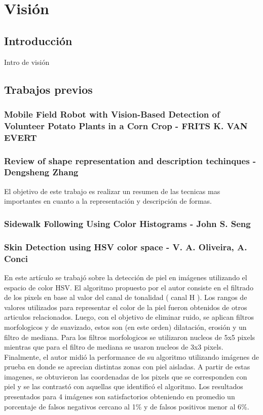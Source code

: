\section{Visi\'on}

\subsection{Introducci\'on}
Intro de visi\'on

\subsection{Trabajos previos}
	\subsubsection{Mobile Field Robot with Vision-Based Detection of Volunteer Potato Plants in a Corn Crop - FRITS K. VAN EVERT}
	\cite{potato}
	\subsubsection{Review of shape representation and description techinques - Dengsheng Zhang}
El objetivo de este trabajo es realizar un resumen de las tecnicas mas importantes en cuanto a la representación y descripción de formas.
	\subsubsection{Sidewalk Following Using Color Histograms - John S. Seng}
	\subsubsection{Skin Detection using HSV color space - V. A. Oliveira, A. Conci}
	En este artículo se trabajó sobre la detección de piel en imágenes utilizando el espacio de color HSV. El algoritmo propuesto 
por el autor consiste en el filtrado de los pixels en base al valor del canal de tonalidad ( canal H ). Los rangos de valores utilizados para 
representar el color de la piel fueron obtenidos de otros articulos relacionados. Luego, con el objetivo de eliminar ruido, se aplican filtros morfologicos y de suavizado, estos son (en este orden) dilatación, erosión y un filtro de mediana. Para los filtros morfologicos se utilizaron nucleos de 5x5 pixels mientras que para el filtro de mediana se usaron nucleos de 3x3 pixels. Finalmente, el autor midió la performance de su algoritmo utilizando imágenes de prueba en donde se aprecian distintas zonas con piel aisladas. A partir de estas imagenes, se obtuvieron las coordenadas de los pixels que se corresponden con piel y se las contrastó con aquellas que identificó el algoritmo. Los resultados presentados para 4 imágenes son satisfactorios obteniendo en promedio un porcentaje de falsos negativos cercano al 1\% y de falsos positivos menor al 6\%.

